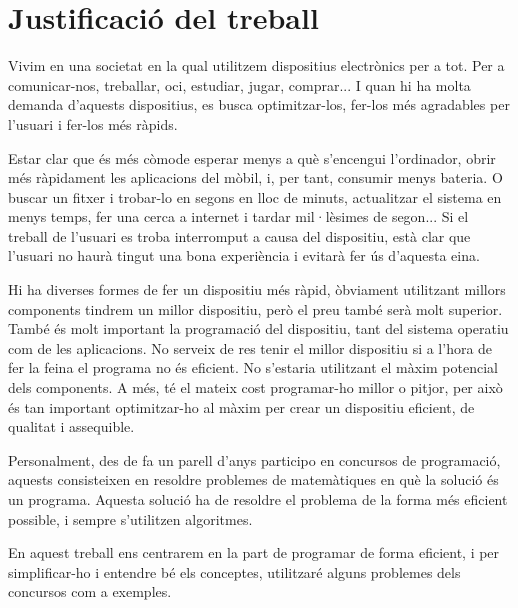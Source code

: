 \section*{Justificació del treball}
Vivim en una societat en la qual utilitzem dispositius electrònics per a tot. Per a comunicar-nos, treballar, oci, estudiar, jugar, comprar... I quan hi ha molta demanda d'aquests dispositius, es busca optimitzar-los, fer-los més agradables per l'usuari i fer-los més ràpids.

Estar clar que és més còmode esperar menys a què s'encengui l'ordinador, obrir més ràpidament les aplicacions del mòbil, i, per tant, consumir menys bateria. O buscar un fitxer i trobar-lo en segons en lloc de minuts, actualitzar el sistema en menys temps, fer una cerca a internet i tardar mil·lèsimes de segon... Si el treball de l'usuari es troba interromput a causa del dispositiu, està clar que l'usuari no haurà tingut una bona experiència i evitarà fer ús d'aquesta eina.

Hi ha diverses formes de fer un dispositiu més ràpid, òbviament utilitzant millors components tindrem un millor dispositiu, però el preu també serà molt superior. També és molt important la programació del dispositiu, tant del sistema operatiu com de les aplicacions. No serveix de res tenir el millor dispositiu si a l'hora de fer la feina el programa no és eficient. No s'estaria utilitzant el màxim potencial dels components. A més, té el mateix cost programar-ho millor o pitjor, per això és tan important optimitzar-ho al màxim per crear un dispositiu eficient, de qualitat i assequible.

Personalment, des de fa un parell d'anys participo en concursos de programació, aquests consisteixen en resoldre problemes de matemàtiques en què la solució és un programa. Aquesta solució ha de resoldre el problema de la forma més eficient possible, i sempre s'utilitzen algoritmes.

En aquest treball ens centrarem en la part de programar de forma eficient, i per simplificar-ho i entendre bé els conceptes, utilitzaré alguns problemes dels concursos com a exemples.

